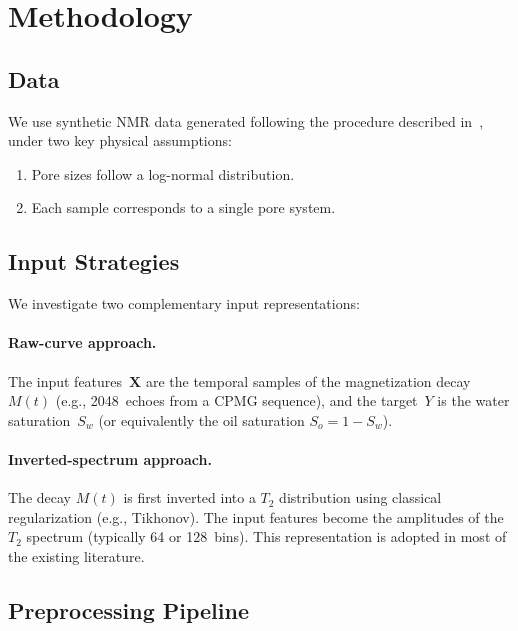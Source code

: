\documentclass[runningheads]{llncs}
\begin{document}
\section{Methodology}
\label{sec:method}

\subsection{Data}
\label{sec:data}

We use synthetic NMR data generated following the procedure described in~\cite{ref_deepswirr},
under two key physical assumptions:
\begin{enumerate}
  \item Pore sizes follow a log-normal distribution.
  \item Each sample corresponds to a single pore system.
\end{enumerate}

\subsection{Input Strategies}
\label{sec:input}

We investigate two complementary input representations:

\paragraph{Raw-curve approach.}
The input features~$\mathbf{X}$ are the temporal samples of the magnetization decay $M(t)$
(e.g., 2048~echoes from a CPMG sequence), and the target~$Y$ is the water
saturation~$S_w$ (or equivalently the oil saturation $S_o = 1 - S_w$).

\paragraph{Inverted-spectrum approach.}
The decay $M(t)$ is first inverted into a $T_2$ distribution using classical regularization
(e.g., Tikhonov). The input features become the amplitudes of the $T_2$ spectrum
(typically 64 or 128~bins). This representation is adopted in most of the existing literature.

\subsection{Preprocessing Pipeline}
\label{sec:preproc}
\end{document}
